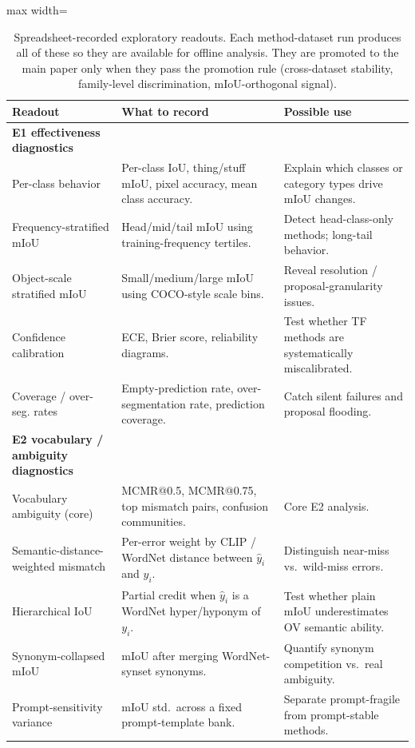\documentclass[11pt,a4paper]{article}
\begin{document}
\begin{table}[H]
\centering
\scriptsize
\caption{Spreadsheet-recorded exploratory readouts. Each method-dataset run produces all of these so they are available for offline analysis. They are promoted to the main paper only when they pass the promotion rule (cross-dataset stability, family-level discrimination, mIoU-orthogonal signal).}
\label{tab:appendix-supporting-readouts}
\begin{adjustbox}{max width=\textwidth}
\begin{tabular}{p{} p{} p{}}
\toprule
Readout & What to record & Possible use \\
\midrule
\textbf{E1 effectiveness diagnostics} & & \\
Per-class behavior & Per-class IoU, thing/stuff mIoU, pixel accuracy, mean class accuracy. & Explain which classes or category types drive mIoU changes. \\
Frequency-stratified mIoU & Head/mid/tail mIoU using training-frequency tertiles. & Detect head-class-only methods; long-tail behavior. \\
Object-scale stratified mIoU & Small/medium/large mIoU using COCO-style scale bins. & Reveal resolution / proposal-granularity issues. \\
Confidence calibration & ECE, Brier score, reliability diagrams. & Test whether TF methods are systematically miscalibrated. \\
Coverage / over-seg. rates & Empty-prediction rate, over-segmentation rate, prediction coverage. & Catch silent failures and proposal flooding. \\
\midrule
\textbf{E2 vocabulary / ambiguity diagnostics} & & \\
Vocabulary ambiguity (core) & MCMR@0.5, MCMR@0.75, top mismatch pairs, confusion communities. & Core E2 analysis. \\
Semantic-distance-weighted mismatch & Per-error weight by CLIP / WordNet distance between $\hat{y}_i$ and $y_i$. & Distinguish near-miss vs.\ wild-miss errors. \\
Hierarchical IoU & Partial credit when $\hat{y}_i$ is a WordNet hyper/hyponym of $y_i$. & Test whether plain mIoU underestimates OV semantic ability. \\
Synonym-collapsed mIoU & mIoU after merging WordNet-synset synonyms. & Quantify synonym competition vs.\ real ambiguity. \\
Prompt-sensitivity variance & mIoU std.\ across a fixed prompt-template bank. & Separate prompt-fragile from prompt-stable methods. \\

\end{tabular}
\end{adjustbox}
\end{table}
\end{document}
